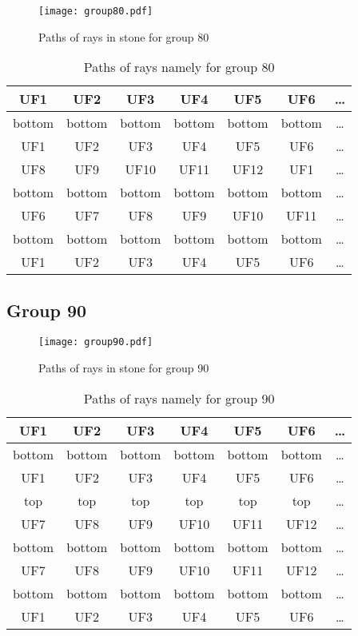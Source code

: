 \begin{figure}[h!]
\centering
\texttt{[image: group80.pdf]}
\caption{Paths of rays in stone for group 80}
\label{table:FigGroup80}
\end{figure}



\begin{table}[h!]
\centering
\begin{tabular}{|c|c|c|c|c|c|c|}
\hline
UF1 & UF2 & UF3 & UF4 & UF5 & UF6 & \dots \\
\hline
bottom & bottom & bottom & bottom & bottom & bottom & \dots \\
\hline
UF1 & UF2 & UF3 & UF4 & UF5 & UF6 & \dots \\
\hline
UF8 & UF9 & UF10 & UF11 & UF12 & UF1 & \dots \\
\hline
bottom & bottom & bottom & bottom & bottom & bottom & \dots \\
\hline
UF6 & UF7 & UF8 & UF9 & UF10 & UF11 & \dots \\
\hline
bottom & bottom & bottom & bottom & bottom & bottom & \dots \\
\hline
UF1 & UF2 & UF3 & UF4 & UF5 & UF6 & \dots \\
\hline
\end{tabular}
\caption{Paths of rays namely for group 80}
\label{table:TableGroup80}
\end{table}
\newpage
\subsection*{Group 90}






\begin{figure}[h!]
\centering
\texttt{[image: group90.pdf]}
\caption{Paths of rays in stone for group 90}
\label{table:FigGroup90}
\end{figure}



\begin{table}[h!]
\centering
\begin{tabular}{|c|c|c|c|c|c|c|}
\hline
UF1 & UF2 & UF3 & UF4 & UF5 & UF6 & \dots \\
\hline
bottom & bottom & bottom & bottom & bottom & bottom & \dots \\
\hline
UF1 & UF2 & UF3 & UF4 & UF5 & UF6 & \dots \\
\hline
top & top & top & top & top & top & \dots \\
\hline
UF7 & UF8 & UF9 & UF10 & UF11 & UF12 & \dots \\
\hline
bottom & bottom & bottom & bottom & bottom & bottom & \dots \\
\hline
UF7 & UF8 & UF9 & UF10 & UF11 & UF12 & \dots \\
\hline
bottom & bottom & bottom & bottom & bottom & bottom & \dots \\
\hline
UF1 & UF2 & UF3 & UF4 & UF5 & UF6 & \dots \\
\hline
\end{tabular}
\caption{Paths of rays namely for group 90}
\label{table:TableGroup90}
\end{table}
\newpage
